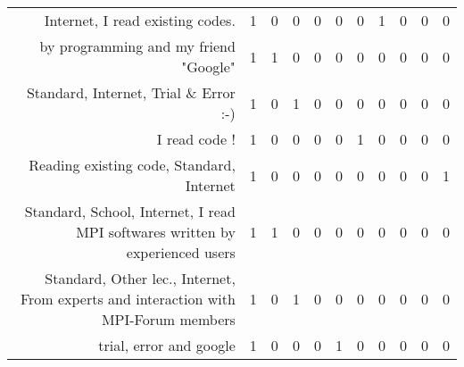 {\begin{landscape}
\begin{longtable}[htb]{r|c|c|c|c|c|c|c|c|c|c}
{Internet, I read existing codes.} & 1 & 0 & 0 & 0 & 0 & 0 & 1 & 0 & 0 & 0 \\%
{by programming and my friend "Google"} & 1 & 1 & 0 & 0 & 0 & 0 & 0 & 0 & 0 & 0 \\%
{Standard, Internet, Trial \& Error :-)} & 1 & 0 & 1 & 0 & 0 & 0 & 0 & 0 & 0 & 0 \\%
{I read code !} & 1 & 0 & 0 & 0 & 0 & 1 & 0 & 0 & 0 & 0 \\%
{Reading existing code, Standard, Internet} & 1 & 0 & 0 & 0 & 0 & 0 & 0 & 0 & 0 & 1 \\%
{Standard, School, Internet, I read MPI softwares written by experienced users} & 1 & 1 & 0 & 0 & 0 & 0 & 0 & 0 & 0 & 0 \\%
{Standard, Other lec., Internet, From experts and interaction with MPI-Forum members} & 1 & 0 & 1 & 0 & 0 & 0 & 0 & 0 & 0 & 0 \\%
{trial, error and google} & 1 & 0 & 0 & 0 & 1 & 0 & 0 & 0 & 0 & 0 \\%
\hline%
\end{longtable}%
\end{landscape}}%
\clearpage%
